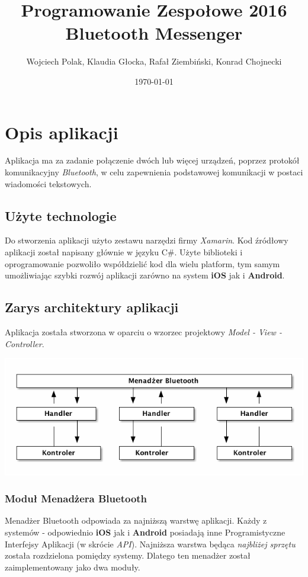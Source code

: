 \documentclass[a4paper, titlepage]{article}
\author{Wojciech Polak, Klaudia Głocka, Rafał Ziembiński, Konrad Chojnecki}
\date{\today}
\title{Programowanie Zespołowe 2016\\\medskip
\large Bluetooth Messenger}
\begin{document}
\maketitle
\tableofcontents

\clearpage
\section{Opis aplikacji}
\label{sec:orgd9d104d}
Aplikacja ma za zadanie połączenie dwóch lub więcej urządzeń, poprzez protokół komunikacyjny \emph{Bluetooth}, w celu zapewnienia podstawowej komunikacji w postaci wiadomości tekstowych.
\subsection{Użyte technologie}
\label{sec:orgd3acfa2}
Do stworzenia aplikacji użyto zestawu narzędzi firmy \emph{Xamarin}. Kod źródłowy aplikacji został napisany głównie w języku C\#.
Użyte biblioteki i oprogramowanie pozwoliło współdzielić kod dla wielu platform, tym samym umożliwiając szybki rozwój aplikacji zarówno na system \textbf{iOS} jak i \textbf{Android}.
\subsection{Zarys architektury aplikacji}
\label{sec:org014a08f}
Aplikacja została stworzona w oparciu o wzorzec projektowy \emph{Model - View - Controller}.

\begin{center}
\includegraphics[width=.9\linewidth]{zarys.png}
\end{center}

\subsubsection{Moduł Menadżera Bluetooth}
\label{sec:orgab0d942}
Menadżer Bluetooth odpowiada za najniższą warstwę aplikacji. Każdy z systemów - odpowiednio \textbf{iOS} jak i \textbf{Android} posiadają inne Programistyczne Interfejsy Aplikacji (w skrócie \emph{API}). Najniższa warstwa będąca \emph{najbliżej sprzętu} została rozdzielona pomiędzy systemy. Dlatego ten menadżer został zaimplementowany jako dwa moduły.
\end{document}
